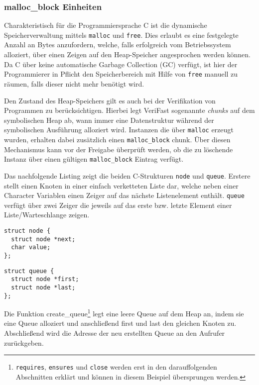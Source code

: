 \subsubsection{malloc\_block Einheiten}

Charakteristisch für die Programmiersprache C ist die dynamische Speicherverwaltung mittels \texttt{malloc} und \texttt{free}. Dies erlaubt es eine festgelegte Anzahl an Bytes anzufordern, welche, falls erfolgreich vom Betriebssystem alloziert, über einen Zeigen auf den Heap-Speicher angesprochen werden können. Da C über keine automatische Garbage Collection (GC) verfügt, ist hier der Programmierer in Pflicht den Speicherbereich mit Hilfe von \texttt{free} manuell zu räumen, falls dieser nicht mehr benötigt wird.

Den Zustand des Heap-Speichers gilt es auch bei der Verifikation von Programmen zu berücksichtigen. Hierbei legt VeriFast sogenannte \emph{chunks} auf dem symbolischen Heap ab, wann immer eine Datenstruktur während der symbolischen Ausführung alloziert wird. Instanzen die über \texttt{malloc} erzeugt wurden, erhalten dabei zusätzlich einen \texttt{malloc\_block} chunk. Über diesen Mechanismus kann vor der Freigabe überprüft werden, ob die zu löschende Instanz über einen gültigen \texttt{malloc\_block} Eintrag verfügt. \cite{Jacobs2010,Jacobs2017}

Das nachfolgende Listing zeigt die beiden C-Strukturen \texttt{node} und \texttt{queue}. Erstere stellt einen Knoten in einer einfach verketteten Liste dar, welche neben einer Character Variablen einen Zeiger auf das nächste Listenelement enthält. \texttt{queue} verfügt über zwei Zeiger die jeweils auf das erste bzw. letzte Element einer Liste/Warteschlange zeigen.

\noindent
\begin{minipage}{.45\textwidth}
\begin{lstlisting}
struct node {
  struct node *next;
  char value;
};
\end{lstlisting}
\end{minipage}
\hfill
\begin{minipage}{.45\textwidth}
\begin{lstlisting}
struct queue {
  struct node *first;
  struct node *last;
};
\end{lstlisting}
\end{minipage}

\noindent
Die Funktion create\_queue\footnote{\texttt{requires}, \texttt{ensures} und \texttt{close} werden erst in den darauffolgenden Abschnitten erklärt und können in diesem Beispiel übersprungen werden.} legt eine leere Queue auf dem Heap an, indem sie eine Queue alloziert und anschließend first und last den gleichen Knoten zu. Abschließend wird die Adresse der neu erstellten Queue an den Aufrufer zurückgeben.

